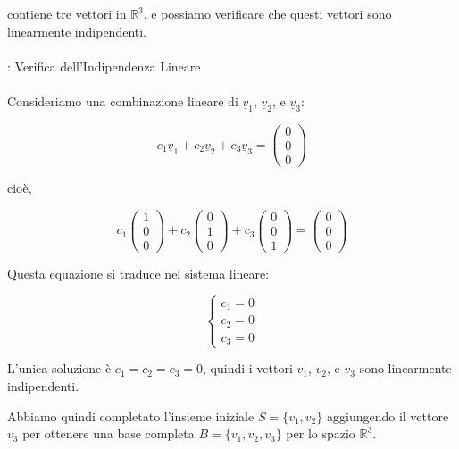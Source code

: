 \begin{es}
  contiene tre vettori in \( \mathbb{R}^3 \), e possiamo verificare
  che questi vettori sono linearmente indipendenti.
  \leavevmode\\\\
  : Verifica dell'Indipendenza Lineare
  \leavevmode\\\\
  Consideriamo una combinazione lineare di \( \underline{v}_1 \), \(
  \underline{v}_2 \), e \( \underline{v}_3 \):

  \[
    c_1 \underline{v}_1 + c_2 \underline{v}_2 + c_3 \underline{v}_3 =
    \begin{pmatrix} 0 \\ 0 \\ 0
    \end{pmatrix}
  \]

  cioè,

  \[
    c_1
    \begin{pmatrix} 1 \\ 0 \\ 0
    \end{pmatrix} + c_2
    \begin{pmatrix} 0 \\ 1 \\ 0
    \end{pmatrix} + c_3
    \begin{pmatrix} 0 \\ 0 \\ 1
    \end{pmatrix} =
    \begin{pmatrix} 0 \\ 0 \\ 0
    \end{pmatrix}
  \]

  Questa equazione si traduce nel sistema lineare:

  \[
    \begin{cases}
      c_1 = 0 \\
      c_2 = 0 \\
      c_3 = 0
    \end{cases}
  \]

  L'unica soluzione è \( c_1 = c_2 = c_3 = 0 \), quindi i vettori \(
  v_1 \), \( v_2 \), e \( v_3 \) sono linearmente indipendenti.

  Abbiamo quindi completato l'insieme iniziale \( S = \{v_1, v_2\} \)
  aggiungendo il vettore \( v_3 \) per ottenere una base completa \(
  B = \{v_1, v_2, v_3\} \) per lo spazio \( \mathbb{R}^3 \).
\end{es}

